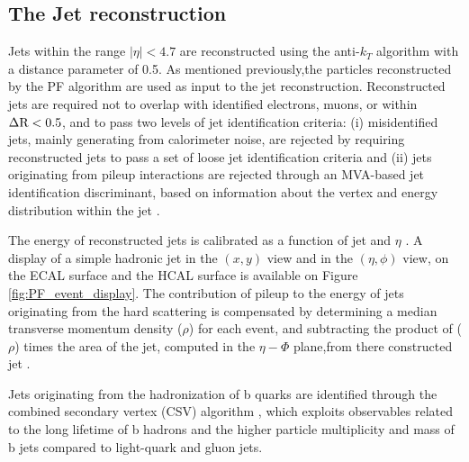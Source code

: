 \subsection {The Jet reconstruction}


Jets within the range \ensuremath{|\eta| < 4.7} are reconstructed using the anti-\ensuremath{k_{T}} algorithm \cite{antikt} with a distance parameter of 0.5. As mentioned previously,the particles reconstructed by the PF algorithm are used as input to the jet reconstruction. Reconstructed jets are required not to overlap with identified electrons, muons, or \hadtau within \ensuremath{\deltar < 0.5}, and to pass two levels of jet identification criteria: (i) misidentified jets, mainly generating from calorimeter noise, are rejected by requiring reconstructed jets to pass a set of loose jet identification criteria \cite{CMS:2010xta} and (ii) jets originating from pileup interactions are rejected through an MVA-based jet identification discriminant, based on information about the vertex and energy distribution within the jet \cite{CMS:2013wea}. 

The energy of reconstructed jets is calibrated as a function of jet \pt and \ensuremath{\eta} \cite{1748-0221-6-11-P11002}. A display of a simple hadronic jet in the $(x, y)$ view and in the $(\eta,\phi)$ view, on the ECAL surface and the HCAL surface is available on Figure \ref{fig:PF_event_display}. The contribution of pileup to the energy of jets originating from the hard scattering is compensated by determining a median transverse momentum density (\ensuremath{\rho}) for each event, and subtracting the product of (\ensuremath{\rho}) times the area of the jet, computed in the \ensuremath{\eta-\Phi} plane,from there constructed jet \pt \cite{Cacciari:2008gn, Cacciari:2007fd}. 

Jets originating from the hadronization of b quarks are identified through the combined secondary vertex (CSV) algorithm \cite{Chatrchyan:2012jua}, which exploits observables related to the long lifetime of b hadrons and the higher particle multiplicity and mass of b jets compared to light-quark and gluon jets.

	
